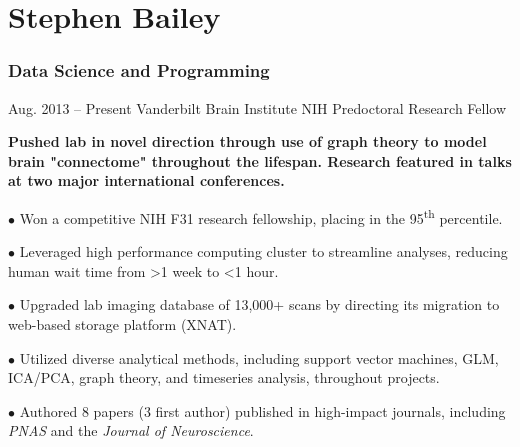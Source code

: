 \documentclass{tccv}
\begin{document}
\part{Stephen Bailey}

\section{Data Science and Programming}

\begin{eventlist}

\item{Aug. 2013 -- Present}
     {Vanderbilt Brain Institute}
     {NIH Predoctoral Research Fellow}  
     
     \textbf{Pushed lab in novel direction  through use of graph theory to model brain "connectome" throughout the lifespan. Research featured in talks at two major international conferences. \href{https://ww5.aievolution.com/hbm1801/index.cfm?do=ev.viewEv&ev=1362}{\color{blue}\Mundus}} 
     \newline

\begin{factlist}
    \item{$\bullet$}
         {Won a competitive NIH F31 research fellowship, placing in the 95\textsuperscript{th} percentile. \href{https://projectreporter.nih.gov/project_info_description.cfm?aid=9328269&icde=35806628}{\color{blue}\Mundus}}
         
    \item{$\bullet$}
         {Leveraged high performance computing cluster to streamline analyses, reducing human wait time from \textgreater 1 week to \textless 1 hour.}
         
    \item{$\bullet$}
         {Upgraded lab imaging database of 13,000+ scans by directing its migration to web-based storage platform (XNAT).}
         
    \item{$\bullet$}
         {Utilized diverse analytical methods, including support vector machines, GLM, ICA/PCA, graph theory, and timeseries analysis, throughout projects. }
         
    \item{$\bullet$}
         {Authored 8 papers (3 first author) published in high-impact journals,  including  \textit{PNAS} and the  \textit{Journal of Neuroscience}. \href{https://scholar.google.com/citations?user=s3nPF1MAAAAJ&hl=en}{\color{blue}\Mundus}}     


\end{factlist}
\end{eventlist}
\end{document}
